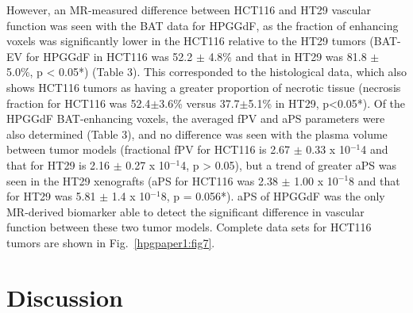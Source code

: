 However, an MR-measured difference between HCT116 and HT29 vascular function was seen with the BAT data for HPGGdF, as the fraction of enhancing voxels was significantly lower in the HCT116 relative to the HT29 tumors (BAT-EV for HPGGdF in HCT116 was 52.2 $\pm$ 4.8\% and that in HT29 was 81.8 $\pm$ 5.0\%, p < 0.05*) (Table 3).
This corresponded to the histological data, which also shows HCT116 tumors as having a greater proportion of necrotic tissue (necrosis fraction for HCT116 was 52.4$\pm$3.6\% versus 37.7$\pm$5.1\% in HT29, p<0.05*).
Of the HPGGdF BAT-enhancing voxels, the averaged fPV and aPS parameters were also determined (Table 3), and no difference was seen with the plasma volume between tumor models (fractional fPV for HCT116 is 2.67 $\pm$ 0.33 x 10$^{-1}$4 and that for HT29 is 2.16 $\pm$ 0.27 x 10$^{-1}$4, p > 0.05), but a trend of greater aPS was seen in the HT29 xenografts (aPS for HCT116 was 2.38 $\pm$ 1.00 x 10$^{-1}$8 and that for HT29 was 5.81 $\pm$ 1.4 x 10$^{-1}$8, p = 0.056*).
aPS of HPGGdF was the only MR-derived biomarker able to detect the significant difference in vascular function between these two tumor models.
Complete data sets for HCT116 tumors are shown in Fig.~\ref{hpgpaper1:fig7}.

\section{Discussion}

